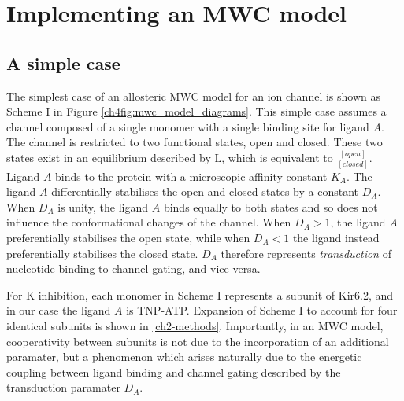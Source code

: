 \section{Implementing an MWC model}

\subsection{A simple case}

The simplest case of an allosteric MWC model for an ion channel is shown as Scheme I in Figure \ref{ch4fig:mwc_model_diagrams}.
This simple case assumes a channel composed of a single monomer with a single binding site for ligand $A$.
The channel is restricted to two functional states, open and closed.
These two states exist in an equilibrium described by L, which is equivalent to $\frac{[open]}{[closed]}$.
Ligand $A$ binds to the protein with a microscopic affinity constant $K_A$.
The ligand $A$ differentially stabilises the open and closed states by a constant $D_A$.
When $D_A$ is unity, the ligand $A$ binds equally to both states and so does not influence the conformational changes of the channel.
When $D_A>1$, the ligand $A$ preferentially stabilises the open state, while when $D_A<1$ the ligand instead preferentially stabilises the closed state.
$D_A$ therefore represents \textit{transduction} of nucleotide binding to channel gating, and vice versa.

For K\ATP{} inhibition, each monomer in Scheme I represents a subunit of Kir6.2, and in our case the ligand $A$ is TNP-ATP.
Expansion of Scheme I to account for four identical subunits is shown in \ref{ch2-methods}.
Importantly, in an MWC model, cooperativity between subunits is not due to the incorporation of an additional paramater, but a phenomenon which arises naturally due to the energetic coupling between ligand binding and channel gating described by the transduction paramater $D_A$.

